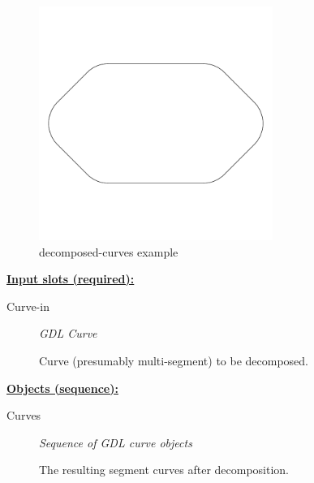 \documentclass [11pt]{book}
\begin{document}
\begin{itemize}
\begin{figure}
\begin{center}
\includegraphics[width=3in,height=3in]{../images/example-decomposed-curves.pdf}
\end{center}

\caption{decomposed-curves example}

\label{fig:decomposed-curves}

\end{figure}





\textbf{
\underline{Input slots (required):}}

\begin{description}

\item [Curve-in]
\emph{GDL Curve}

 Curve (presumably multi-segment) to be decomposed.




\end{description}






\textbf{
\underline{Objects (sequence):}}

\begin{description}

\item [Curves]
\emph{Sequence of GDL curve objects}

 The resulting segment curves after decomposition.




\end{description}








\end{itemize}
\end{document}
